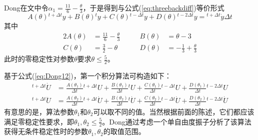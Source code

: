 Dong在文中令$\alpha_1=\frac{11}{6}-\frac{\theta}{3}$，于是得到与公式(\ref{eq:threebackdiff})等价形式
\begin{equation}
A(\theta){^{t+\Delta t}\!y}+B(\theta){^{t}\!y}+C(\theta){^{t-\Delta t}\!y}+D(\theta){^{t-2\Delta t}\!y}={^{t+\Delta t}\!\dot{y}}\Delta t\label{eq:Dong12}
\end{equation}
其中
\begin{alignat}{2}
A(\theta)&=\frac{11}{6}-\frac{\theta}{3}&\qquad B(\theta)&=\theta-3\label{eq:DongA}\\
C(\theta)&=\frac{3}{2}-\theta&\qquad D(\theta)&=-\frac{1}{3}+\frac{\theta}{3}\label{eq:DongD}
\end{alignat}
此时的零稳定性对参数$\theta$要求$\theta\le\frac{5}{2}$。

基于公式(\ref{eq:Dong12})，第一个积分算法可构造如下：
\begin{align}
{^{t+\Delta t}\!\dot{U}}&=\frac{A(\theta_1)}{\Delta t}{^{t+\Delta t}\!U}+\frac{B(\theta_1)}{\Delta t}{^{t}\!U}+\frac{C(\theta_1)}{\Delta t}{^{t-\Delta t}\!U}+\frac{D(\theta_1)}{\Delta t}{^{t-2\Delta t}\!U}\\
{^{t+\Delta t}\!\ddot{U}}&=\frac{A(\theta_2)}{\Delta t}{^{t+\Delta t}\!\dot{U}}+\frac{B(\theta_2)}{\Delta t}{^{t}\!\dot{U}}+\frac{C(\theta_2)}{\Delta t}{^{t-\Delta t}\!\dot{U}}+\frac{D(\theta_2)}{\Delta t}{^{t-2\Delta t}\!\dot{U}}
\end{align}
有意思的是，算法参数$\theta_1$和$\theta_2$可以取不同的值。当然根据前面的陈述，它们都应该满足零稳定性要求，即$\theta_1,\theta_2\le\frac{5}{2}$。Dong通过考虑一个单自由度振子分析了该算法获得无条件稳定性时的参数$\theta_1,\theta_2$的取值范围。


